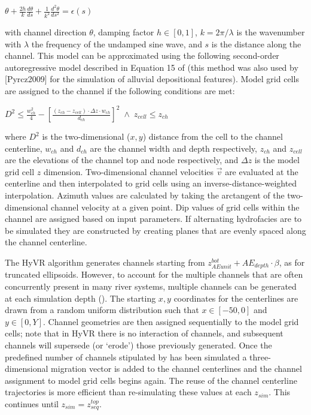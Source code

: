 \documentclass[letterpaper,10pt,english]{sphinxmanual}
\begin{document}
\(\theta + \frac{2h}{k} \frac{d\theta}{ds} + \frac{1}{k^2} \frac{d^2\theta}{ds^2}  = \epsilon(s)\)

with channel direction \(\theta\), damping factor \(h \in [0,1]\), \(k = 2\pi/\lambda\) is the wavenumber with \(\lambda\) the frequency of the undamped sine wave, and \(s\) is the distance along the channel. This model can be approximated using the following second-order autoregressive model described in Equation 15 of \label{methods:id6}{\hyperref[references:ferguson1976]{\sphinxcrossref{{[}Fer76{]}}}} (this method was also used by {[}Pyrcz2009{]} for the simulation of alluvial depositional features). Model grid cells are assigned to the channel if the following conditions are met:

\(D^2 \leqslant \frac{w^2_{ch}}{4} - \left[ \frac{(z_{ch} - z_{cell})\cdot\Delta z \cdot w_{ch}}{d_{ch}} \right] ^2 \; \wedge \; z_{cell} \leqslant z_{ch}\)

where \(D^2\) is the two-dimensional (\(x,y\)) distance from the cell to the channel centerline, \(w_{ch}\) and \(d_{ch}\) are the channel width and depth respectively, \(z_{ch}\) and \(z_{cell}\) are the elevations of the channel top and node respectively, and \(\Delta z\) is the model grid cell \(z\) dimension. Two-dimensional channel velocities \(\vec{v}\) are evaluated at the centerline and then interpolated to grid cells using an inverse-distance-weighted interpolation. Azimuth values are calculated by taking the arctangent of the two-dimensional channel velocity at a given point. Dip values of grid cells within the channel are assigned based on input parameters. If alternating hydrofacies are to be simulated they are constructed by creating planes that are evenly spaced along the channel centerline.

The HyVR algorithm generates channels starting from \(z^{bot}_{AE unit} +AE_{depth}\cdot\beta\), as for truncated ellipsoids. However, to account for the multiple channels that are often concurrently present in many river systems, multiple channels can be generated at each simulation depth (). The starting \(x,y\) coordinates for the centerlines are drawn from a random uniform distribution such that \(x\in[-50,0]\) and \(y\in[0,Y]\). Channel geometries are then assigned sequentially to the model grid cells; note that in HyVR there is no interaction of channels, and subsequent channels will supersede (or `erode') those previously generated.  Once the predefined number of channels stipulated by  has been simulated a three-dimensional migration vector  is added to the channel centerlines and the channel assignment to model grid cells begins again. The reuse of the channel centerline trajectories is more efficient than re-simulating these values at each \(z_{sim}\). This continues until  \(z_{sim} = z^{top}_{seq}\).
\end{document}
